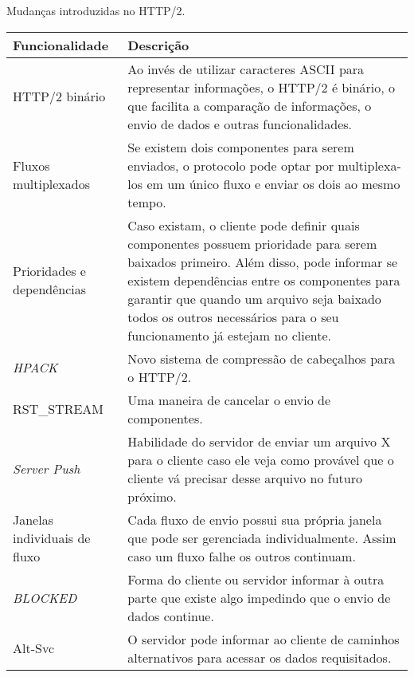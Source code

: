 \begin{quadro}[!htb]
	\centering
	\caption{Mudanças introduzidas no HTTP/2. \label{qua:http2novo}}
	\begin{tabularx}{\textwidth}{| X | X |}
		\hline
		\textbf{Funcionalidade} & \textbf{Descrição} \\
		\hline
		HTTP/2 binário & Ao invés de utilizar caracteres ASCII para representar informações, o HTTP/2 é binário, o que facilita a comparação de informações, o envio de dados e outras funcionalidades. \\
		\hline
		Fluxos multiplexados & Se existem dois componentes para serem enviados, o protocolo pode optar por multiplexa-los em um único fluxo e enviar os dois ao mesmo tempo. \\
		\hline
		Prioridades e dependências & Caso existam, o cliente pode definir quais componentes possuem prioridade para serem baixados primeiro. Além disso, pode informar se existem dependências entre os  componentes para garantir que quando um arquivo seja baixado todos os outros necessários para o seu funcionamento já estejam no cliente. \\
		\hline
		\textit{HPACK} & Novo sistema de compressão de cabeçalhos para o HTTP/2. \\
		\hline
		RST\_STREAM & Uma maneira de cancelar o envio de componentes. \\
		\hline
		\textit{Server Push} & Habilidade do servidor de enviar um arquivo X para o cliente caso ele veja como provável que o cliente vá precisar desse arquivo no futuro próximo. \\
		\hline
		Janelas individuais de fluxo & Cada fluxo de envio possui sua própria janela que pode ser gerenciada individualmente. Assim caso um fluxo falhe os outros continuam. \\
		\hline
		\textit{BLOCKED} & Forma do cliente ou servidor informar à outra parte que existe algo impedindo que o envio de dados continue. \\
		\hline
		Alt-Svc & O servidor pode informar ao cliente de caminhos alternativos para acessar os dados requisitados. \\
		\hline
	\end{tabularx}
\end{quadro}